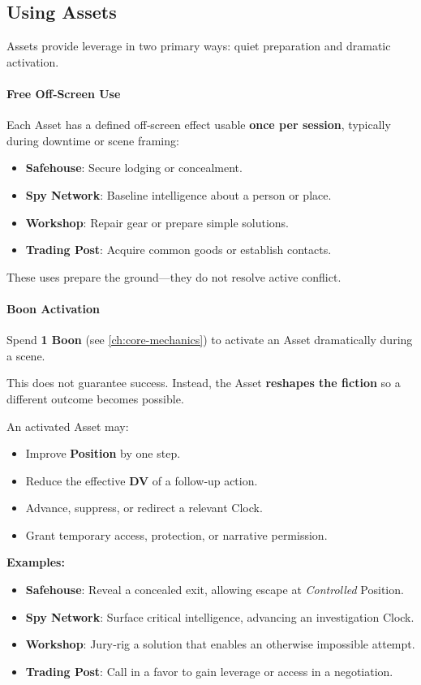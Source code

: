 \subsection*{Using Assets}
\label{sec:using-assets}

Assets provide leverage in two primary ways: quiet preparation and dramatic activation.

\paragraph{Free Off‑Screen Use}
\label{sec:asset-free-use}
Each Asset has a defined off‑screen effect usable \textbf{once per session}, typically during downtime or scene framing:
\begin{itemize}
\item \textbf{Safehouse}: Secure lodging or concealment.
\item \textbf{Spy Network}: Baseline intelligence about a person or place.
\item \textbf{Workshop}: Repair gear or prepare simple solutions.
\item \textbf{Trading Post}: Acquire common goods or establish contacts.
\end{itemize}
These uses prepare the ground—they do not resolve active conflict.

\paragraph{Boon Activation}
\label{sec:asset-boon-activation}
Spend \textbf{1 Boon} (see \ref{ch:core-mechanics}) to activate an Asset dramatically during a scene.

This does not guarantee success. Instead, the Asset \textbf{reshapes the fiction} so a different outcome becomes possible.

An activated Asset may:
\begin{itemize}
  \item Improve \textbf{Position} by one step.
  \item Reduce the effective \textbf{DV} of a follow‑up action.
  \item Advance, suppress, or redirect a relevant Clock.
  \item Grant temporary access, protection, or narrative permission.
\end{itemize}

\textbf{Examples:}
\begin{itemize}
  \item \textbf{Safehouse}: Reveal a concealed exit, allowing escape at \emph{Controlled} Position.
  \item \textbf{Spy Network}: Surface critical intelligence, advancing an investigation Clock.
  \item \textbf{Workshop}: Jury‑rig a solution that enables an otherwise impossible attempt.
  \item \textbf{Trading Post}: Call in a favor to gain leverage or access in a negotiation.
\end{itemize}

